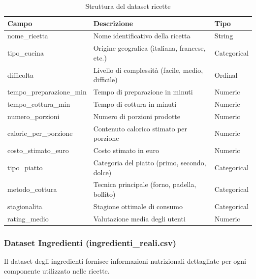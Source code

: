 \documentclass[12pt,a4paper]{article}
\begin{document}
\begin{table}[H]
\centering
\begin{tabular}{@{}lp{7cm}l@{}}
\toprule
\textbf{Campo} & \textbf{Descrizione} & \textbf{Tipo} \\
\midrule
nome\_ricetta & Nome identificativo della ricetta & String \\
tipo\_cucina & Origine geografica (italiana, francese, etc.) & Categorical \\
difficolta & Livello di complessità (facile, medio, difficile) & Ordinal \\
tempo\_preparazione\_min & Tempo di preparazione in minuti & Numeric \\
tempo\_cottura\_min & Tempo di cottura in minuti & Numeric \\
numero\_porzioni & Numero di porzioni prodotte & Numeric \\
calorie\_per\_porzione & Contenuto calorico stimato per porzione & Numeric \\
costo\_stimato\_euro & Costo stimato in euro & Numeric \\
tipo\_piatto & Categoria del piatto (primo, secondo, dolce) & Categorical \\
metodo\_cottura & Tecnica principale (forno, padella, bollito) & Categorical \\
stagionalita & Stagione ottimale di consumo & Categorical \\
rating\_medio & Valutazione media degli utenti & Numeric \\
\bottomrule
\end{tabular}
\caption{Struttura del dataset ricette}
\label{tab:ricette_structure}
\end{table}

\subsubsection{Dataset Ingredienti (ingredienti\_reali.csv)}

Il dataset degli ingredienti fornisce informazioni nutrizionali dettagliate per ogni componente utilizzato nelle ricette.
\end{document}
